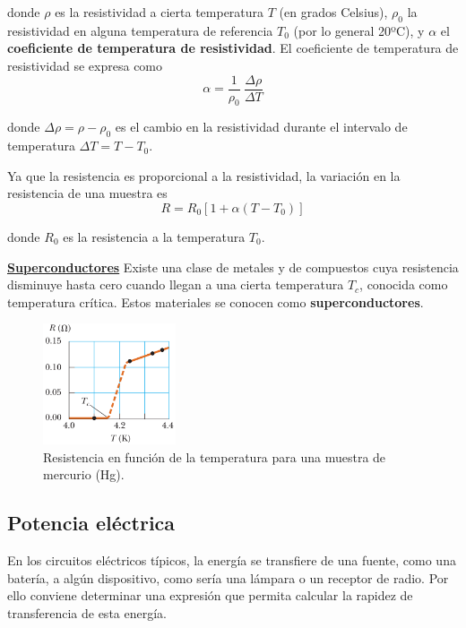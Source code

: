     \PN donde $\rho$ es la resistividad a cierta temperatura $T$ (en grados Celsius), $\rho_{0}$ la resistividad en
    alguna temperatura de referencia $T_{0}$ (por lo general 20ºC), y $\alpha$ el \textbf{coeficiente de temperatura de
    resistividad}. El coeficiente de temperatura de resistividad se expresa como
    \begin{equation*}
      \alpha = \frac{1}{\rho_{0}} \ \frac{\Delta \rho}{\Delta T}
    \end{equation*}

    \PN donde $\Delta \rho = \rho - \rho_{0}$ es el cambio en la resistividad durante el intervalo de temperatura
    $\Delta T = T - T_{0}$.

    \PN Ya que la resistencia es proporcional a la resistividad, la variación en la resistencia de una muestra es
    \begin{equation*}
      R = R_{0} \left[1 + \alpha (T - T_{0})\right]
    \end{equation*}

    \PN donde $R_{0}$ es la resistencia a la temperatura $T_{0}$.

  \VS
  \PN \textbf{\underline{Superconductores}}
  \PN Existe una clase de metales y de compuestos cuya resistencia disminuye hasta cero cuando llegan a una cierta
  temperatura $T_{c}$, conocida como temperatura crítica. Estos materiales se conocen como \textbf{superconductores}.

  \begin{figure}[H]
  \centering
    \includegraphics[width=0.35\textwidth]{4/figure_8}
    \caption{Resistencia en función de la temperatura para una muestra de mercurio (Hg).}
  \end{figure}

  \subsection{Potencia eléctrica}
    \PN En los circuitos eléctricos típicos, la energía se transfiere de una fuente, como una batería, a algún
    dispositivo, como sería una lámpara o un receptor de radio. Por ello conviene determinar una expresión que permita
    calcular la rapidez de transferencia de esta energía.

